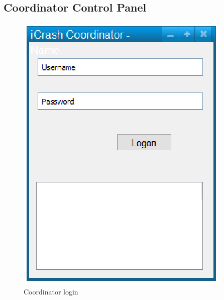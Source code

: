 \subsection{Coordinator Control Panel}

\begin{figure}
  \centering
    \includegraphics{images/mockups/feature1-login/CoordinatorLogon.eps}
  \caption{Coordinator login}
  \label{fig:CoordinatorLogin}
\end{figure}



